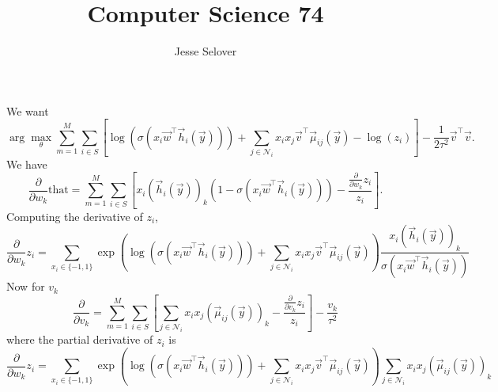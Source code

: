 \documentclass[12pt]{article}
\theoremstyle{remark}
\begin{document}
\title{Computer Science 74}
\author{Jesse Selover}
\maketitle

We want
\[
\arg\max_\theta \sum_{m=1}^M \sum_{i \in S} \left[
  \log(\sigma(x_i\vec{w}^\top \vec{h}_i(\vec{y}))) + \sum_{j \in
    \mathcal{N}_i} x_i x_j \vec{v}^\top \vec{\mu}_{ij}(\vec{y}) -
  \log(z_i) \right] - \frac{1}{2\tau^2}\vec{v}^\top\vec{v}.
\]
We have
\[
\frac{\partial}{\partial w_k} \text{that} = \sum_{m=1}^M \sum_{i \in
  S} \left[ x_i(\vec{h}_i(\vec{y}))_k(1-\sigma(x_i \vec{w}^\top
  \vec{h}_i(\vec{y}))) - \frac{\frac{\partial}{\partial w_k} z_i}{z_i}
\right].
\]
Computing the derivative of $z_i$,
\[
\frac{\partial}{\partial w_k} z_i = \sum_{x_i \in \{-1,1\}}
\exp\left(\log(\sigma(x_i\vec{w}^\top \vec{h}_i(\vec{y}))) +
  \sum_{j \in \mathcal{N}_i} x_i x_j \vec{v}^\top
  \vec{\mu}_{ij}(\vec{y})\right)\frac{x_i(\vec{h}_i(\vec{y}))_k}{\sigma(x_i\vec{w}^\top\vec{h}_i(\vec{y}))}
\]
Now for $v_k$
\[
\frac{\partial}{\partial v_k} = \sum_{m=1}^M \sum_{i \in S} \left[
  \sum_{j \in \mathcal{N}_i} x_i x_j (\vec{\mu}_{ij}(\vec{y}))_k -
  \frac{\frac{\partial}{\partial v_k} z_i}{z_i} \right] - \frac{v_k}{\tau^2}
\]
where the partial derivative of $z_i$ is
\[
\frac{\partial}{\partial w_k} z_i = \sum_{x_i \in \{-1,1\}}
\exp\left(\log(\sigma(x_i\vec{w}^\top \vec{h}_i(\vec{y}))) +
  \sum_{j \in \mathcal{N}_i} x_i x_j \vec{v}^\top
  \vec{\mu}_{ij}(\vec{y})\right)\sum_{j \in \mathcal{N}_i} x_i x_j(\vec{\mu}_{ij}(\vec{y}))_k
\]
\end{document}

